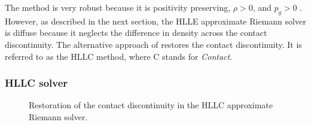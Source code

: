 The method is very robust because it is positivity preserving, $\rho > 0$, and $p_g > 0$ \citep{Einfeldt:1991}.  However, as described in the next section, the HLLE approximate Riemann solver is diffuse because it neglects the difference in density across the contact discontinuity.  The alternative approach of \citet{Toro:1994} restores the contact discontinuity.  It is referred to as the HLLC method, where C stands for \emph{Contact}.  

\subsubsection[HLLC solver]{HLLC solver}
\label{sec:hllc}

\begin{figure}[htbp]\figSpace
\begin{center}

\end{center}
\caption{Restoration of the contact discontinuity in the HLLC approximate Riemann solver.}
\label{fig:hllc_rstates}
\figSpace
\end{figure}

